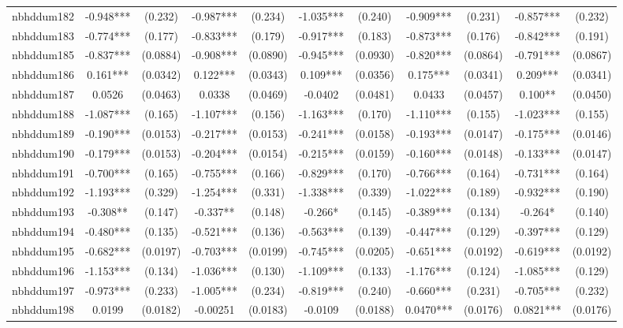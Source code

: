 \documentclass[]{article}
\begin{document}
\begin{tabular}{lcccccccccc}
nbhddum182 & -0.948*** & (0.232) & -0.987*** & (0.234) & -1.035*** & (0.240) & -0.909*** & (0.231) & -0.857*** & (0.232) \\
nbhddum183 & -0.774*** & (0.177) & -0.833*** & (0.179) & -0.917*** & (0.183) & -0.873*** & (0.176) & -0.842*** & (0.191) \\
nbhddum185 & -0.837*** & (0.0884) & -0.908*** & (0.0890) & -0.945*** & (0.0930) & -0.820*** & (0.0864) & -0.791*** & (0.0867) \\
nbhddum186 & 0.161*** & (0.0342) & 0.122*** & (0.0343) & 0.109*** & (0.0356) & 0.175*** & (0.0341) & 0.209*** & (0.0341) \\
nbhddum187 & 0.0526 & (0.0463) & 0.0338 & (0.0469) & -0.0402 & (0.0481) & 0.0433 & (0.0457) & 0.100** & (0.0450) \\
nbhddum188 & -1.087*** & (0.165) & -1.107*** & (0.156) & -1.163*** & (0.170) & -1.110*** & (0.155) & -1.023*** & (0.155) \\
nbhddum189 & -0.190*** & (0.0153) & -0.217*** & (0.0153) & -0.241*** & (0.0158) & -0.193*** & (0.0147) & -0.175*** & (0.0146) \\
nbhddum190 & -0.179*** & (0.0153) & -0.204*** & (0.0154) & -0.215*** & (0.0159) & -0.160*** & (0.0148) & -0.133*** & (0.0147) \\
nbhddum191 & -0.700*** & (0.165) & -0.755*** & (0.166) & -0.829*** & (0.170) & -0.766*** & (0.164) & -0.731*** & (0.164) \\
nbhddum192 & -1.193*** & (0.329) & -1.254*** & (0.331) & -1.338*** & (0.339) & -1.022*** & (0.189) & -0.932*** & (0.190) \\
nbhddum193 & -0.308** & (0.147) & -0.337** & (0.148) & -0.266* & (0.145) & -0.389*** & (0.134) & -0.264* & (0.140) \\
nbhddum194 & -0.480*** & (0.135) & -0.521*** & (0.136) & -0.563*** & (0.139) & -0.447*** & (0.129) & -0.397*** & (0.129) \\
nbhddum195 & -0.682*** & (0.0197) & -0.703*** & (0.0199) & -0.745*** & (0.0205) & -0.651*** & (0.0192) & -0.619*** & (0.0192) \\
nbhddum196 & -1.153*** & (0.134) & -1.036*** & (0.130) & -1.109*** & (0.133) & -1.176*** & (0.124) & -1.085*** & (0.129) \\
nbhddum197 & -0.973*** & (0.233) & -1.005*** & (0.234) & -0.819*** & (0.240) & -0.660*** & (0.231) & -0.705*** & (0.232) \\
nbhddum198 & 0.0199 & (0.0182) & -0.00251 & (0.0183) & -0.0109 & (0.0188) & 0.0470*** & (0.0176) & 0.0821*** & (0.0176) \\

\end{tabular}
\end{document}
